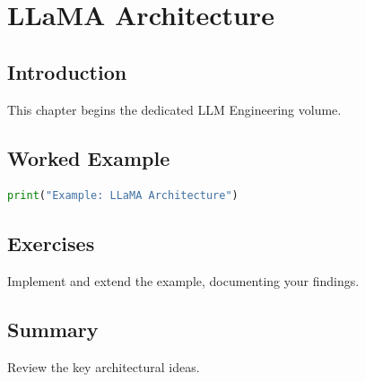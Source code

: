 \chapter{LLaMA Architecture}
\label{chap:vol9-3}



\section{Introduction}
This chapter begins the dedicated LLM Engineering volume.

\section{Worked Example}
\begin{lstlisting}[language=Python]
print("Example: LLaMA Architecture")
\end{lstlisting}

\section{Exercises}
\begin{exercise}
Implement and extend the example, documenting your findings.
\end{exercise}

\section{Summary}
Review the key architectural ideas.
